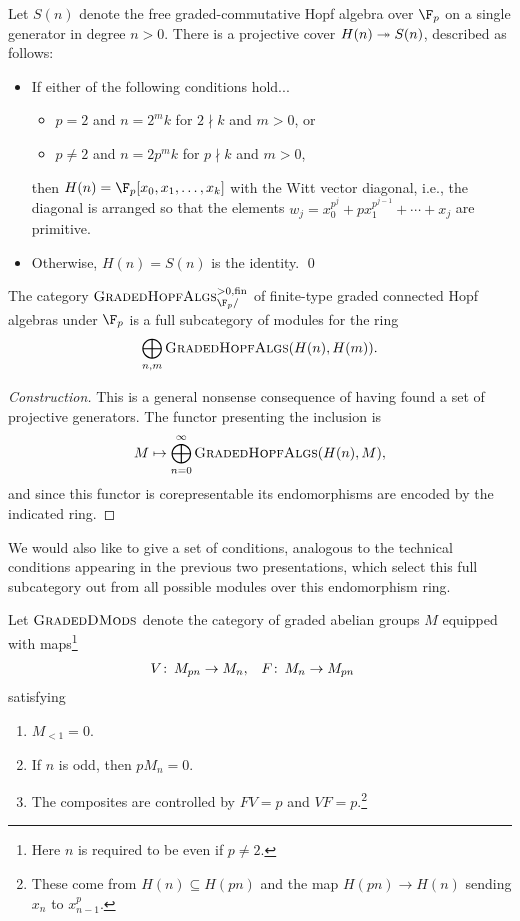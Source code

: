 \begin{theorem}
Let \(S(n)\) denote the free graded-commutative Hopf algebra over \(\F_p\) on a single generator in degree \(n > 0\).  There is a projective cover \(H(n) \twoheadrightarrow S(n)\), described as follows:
\begin{itemize}
\item If either of the following conditions hold...
\begin{itemize}
\item \(p = 2\) and \(n = 2^m k\) for \(2 \nmid k\) and \(m > 0\), or
\item \(p \ne 2\) and \(n = 2p^m k\) for \(p \nmid k\) and \(m > 0\),
\end{itemize}
then \(H(n) = \F_p[x_0, x_1, \ldots, x_k]\) with the Witt vector diagonal, i.e., the diagonal is arranged so that the elements \(w_j = x_0^{p^j} + p x_1^{p^{j-1}} + \cdots + x_j\) are primitive.
\item Otherwise, \(H(n) = S(n)\) is the identity.
\qed
\end{itemize}
\end{theorem}

\begin{corollary}
The category \(\CatOf{GradedHopfAlgs}^{> 0, \fin}_{\F_p/}\) of finite-type graded connected Hopf algebras under \(\F_p\) is a full subcategory of modules for the ring \[\bigoplus_{n, m} \normalfont\textsc{GradedHopfAlgs}(H(n), H(m)).\]
\end{corollary}
\begin{proof}[Construction]
This is a general nonsense consequence of having found a set of projective generators.  The functor presenting the inclusion is \[M \mapsto \bigoplus_{n=0}^\infty \normalfont\textsc{GradedHopfAlgs}(H(n), M),\] and since this functor is corepresentable its endomorphisms are encoded by the indicated ring.
\end{proof}

We would also like to give a set of conditions, analogous to the technical conditions appearing in the previous two presentations, which select this full subcategory out from all possible modules over this endomorphism ring.

\begin{definition}
Let \(\normalfont\textsc{GradedDMods}\) denote the category of graded abelian groups \(M\) equipped with maps\footnote{Here \(n\) is required to be even if \(p \ne 2\).}
\begin{align*}
V\colon\thinspace M_{pn} & \to M_n, &
F\colon\thinspace M_n & \to M_{pn}
\end{align*}
satisfying
\begin{enumerate}
\item \(M_{< 1} = 0\).
\item If \(n\) is odd, then \(pM_n = 0\).
\item The composites are controlled by \(FV = p\) and \(VF = p\).\footnote{These come from \(H(n) \subseteq H(pn)\) and the map \(H(pn) \to H(n)\) sending \(x_n\) to \(x_{n-1}^p\).}
\end{enumerate}
\end{definition}


